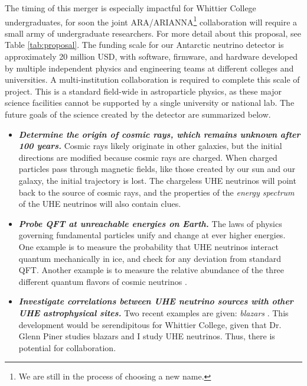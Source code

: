 \documentclass[../../main.tex]{subfiles}
\begin{document}
The timing of this merger is especially impactful for Whittier College undergraduates, for soon the joint ARA/ARIANNA\footnote{We are still in the process of choosing a new name.} collaboration will require a small army of undergraduate researchers.  For more detail about this proposal, see Table \ref{tab:proposal}.  The funding scale for our Antarctic neutrino detector is approximately 20 million USD, with software, firmware, and hardware developed by multiple independent physics and engineering teams at different colleges and universities.  A multi-institution collaboration is required to complete this scale of project.  This is a standard field-wide in astroparticle physics, as these major science facilities cannot be supported by a single university or national lab.  The future goals of the science created by the detector are summarized below. \\ \hspace{0.1cm}

\begin{itemize}
\item \textbf{\textit{Determine the origin of cosmic rays, which remains unknown after 100 years.}}  Cosmic rays likely originate in other galaxies, but the initial directions are modified because cosmic rays are charged.  When charged particles pass through magnetic fields, like those created by our sun and our galaxy, the initial trajectory is lost. The chargeless UHE neutrinos will point back to the source of cosmic rays, and the properties of the \textit{energy spectrum} of the UHE neutrinos will also contain clues.
\item \textbf{\textit{Probe QFT at unreachable energies on Earth.}}  The laws of physics governing fundamental particles unify and change at ever higher energies.  One example is to measure the probability that UHE neutrinos interact quantum mechanically in ice, and check for any deviation from standard QFT. Another example is to measure the relative abundance of the three different quantum flavors of cosmic neutrinos \cite{bustamante2017measurement} \cite{connolly2011calculation}. 
\item \textit{\textbf{Investigate correlations between UHE neutrino sources with other UHE astrophysical sites.}}  Two recent examples are given: \textit{blazars} \cite{eaat2890}.  This development would be serendipitous for Whittier College, given that Dr. Glenn Piner studies blazars \cite{piner2018multiepoch} and I study UHE neutrinos. Thus, there is potential for collaboration.
\end{itemize}
\end{document}
